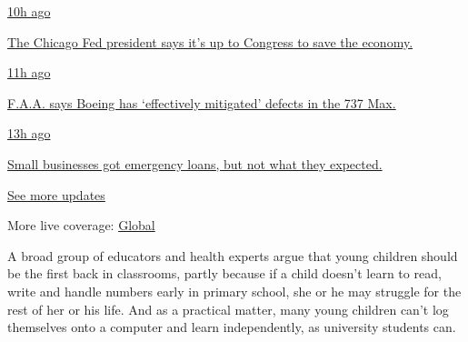 \href{https://www.nytimes3xbfgragh.onion/live/2020/08/03/business/stock-market-today-coronavirus?action=click\&pgtype=Article\&state=default\&region=MAIN_CONTENT_1\&context=storylines_live_updates\#the-chicago-fed-president-says-its-up-to-congress-to-save-the-economy}{10h
ago}

\href{https://www.nytimes3xbfgragh.onion/live/2020/08/03/business/stock-market-today-coronavirus?action=click\&pgtype=Article\&state=default\&region=MAIN_CONTENT_1\&context=storylines_live_updates\#the-chicago-fed-president-says-its-up-to-congress-to-save-the-economy}{The
Chicago Fed president says it's up to Congress to save the economy.}

\href{https://www.nytimes3xbfgragh.onion/live/2020/08/03/business/stock-market-today-coronavirus?action=click\&pgtype=Article\&state=default\&region=MAIN_CONTENT_1\&context=storylines_live_updates\#faa-says-boeing-has-effectively-mitigated-defects-in-the-737-max}{11h
ago}

\href{https://www.nytimes3xbfgragh.onion/live/2020/08/03/business/stock-market-today-coronavirus?action=click\&pgtype=Article\&state=default\&region=MAIN_CONTENT_1\&context=storylines_live_updates\#faa-says-boeing-has-effectively-mitigated-defects-in-the-737-max}{F.A.A.
says Boeing has `effectively mitigated' defects in the 737 Max.}

\href{https://www.nytimes3xbfgragh.onion/live/2020/08/03/business/stock-market-today-coronavirus?action=click\&pgtype=Article\&state=default\&region=MAIN_CONTENT_1\&context=storylines_live_updates\#small-businesses-got-emergency-loans-but-not-what-they-expected}{13h
ago}

\href{https://www.nytimes3xbfgragh.onion/live/2020/08/03/business/stock-market-today-coronavirus?action=click\&pgtype=Article\&state=default\&region=MAIN_CONTENT_1\&context=storylines_live_updates\#small-businesses-got-emergency-loans-but-not-what-they-expected}{Small
businesses got emergency loans, but not what they expected.}

\href{https://www.nytimes3xbfgragh.onion/live/2020/08/03/business/stock-market-today-coronavirus?action=click\&pgtype=Article\&state=default\&region=MAIN_CONTENT_1\&context=storylines_live_updates}{See
more updates}

More live coverage:
\href{https://www.nytimes3xbfgragh.onion/2020/08/03/world/coronavirus-covid-19.html?action=click\&pgtype=Article\&state=default\&region=MAIN_CONTENT_1\&context=storylines_live_updates}{Global}

A broad group of educators and health experts argue that young children
should be the first back in classrooms, partly because if a child
doesn't learn to read, write and handle numbers early in primary school,
she or he may struggle for the rest of her or his life. And as a
practical matter, many young children can't log themselves onto a
computer and learn independently, as university students can.

